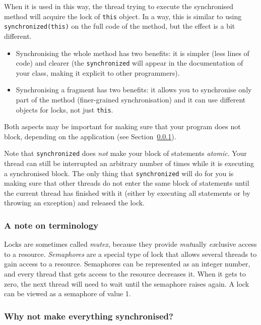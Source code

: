 When it is used in this way, the thread trying to execute the
synchronised method will acquire the lock of \verb+this+ object. In a
way, this is similar to using \verb+synchronized(this)+ on the full
code of the method, but the
effect is a bit different. 

\begin{itemize}
\item Synchronising the whole method has two
benefits: it is simpler (less lines of code) and clearer (the
\verb+synchronized+ will appear in the documentation of your class,
making it explicit to other programmers).
\item Synchronising a fragment has
two benefits: it allows you to synchronise only part of the method
(finer-grained synchronisation) 
and it can use different objects for locks, not just \verb+this+. 
\end{itemize}

Both aspects may be important for making sure that your program does
not block, depending on the application (see
Section~\ref{sec:why-not-make}).

Note that \verb+synchronized+ does \emph{not} make your block of statements
\emph{atomic}. Your thread can still be interrupted an arbitrary
number of times while it is executing a
synchronised block. The only thing that \verb+synchronized+ will do
for you is making sure that other threads do not enter the same block
of statements until the current thread has finished with it (either by
executing all statements or by throwing an exception) and
released the lock. 

\subsubsection*{A note on terminology}
\label{sec:note-terminology}

Locks are sometimes called \emph{mutex}, because they provide \emph{mut}ually
\emph{ex}clusive access to a resource. \emph{Semaphores} are a special type
of lock that allows several threads to gain access to a
resource. Semaphores can be represented as an integer number, and
every thread that gets access to the resource decreases it. When it
gets to zero, the next thread will need to wait until the semaphore
raises again. A lock can be viewed as a semaphore of value 1. 

\subsubsection{Why not make everything synchronised?}
\label{sec:why-not-make}


